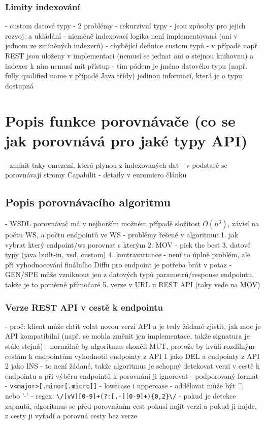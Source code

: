 \documentclass[czech,DP]{thesiskiv}
\begin{document}
\subsection{Limity indexování}

 - custom datové typy
 - 2 problémy
	- rekurzivní typy
		- jsou způsoby pro jejich rozvoj: \cite{abadi1995subytping} a ukládání
		- nicméně indexovací logika není implementovaná (ani v jednom ze zmíněných indexerů)
	- chybějící definice custom typů
		- v případě např REST jsou uloženy v implementaci (nemusí se jednat ani o stejnou knihovnu) a indexer k nim nemusí mít přístup
		- tím pádem je jméno datového typu (např. fully qualified name v případě Java třídy) jedinou informací, která je o typu dostupná

\chapter{Popis funkce porovnávače (co se jak porovnává pro jaké typy API)}

- zmínit taky omezení, která plynou z indexovaných dat
- v podstatě se porovnávají stromy Capabilit
- detaily v euromicro článku

\section{Popis porovnávacího algoritmu}
- WSDL porovnávač má v nejhorším možném případě složitost $O(n^3)$, závisí na počtu WS, a počtu endpointů ve WS 
- problémy řešené v algoritmu:
	1. jak vybrat který endpoint/ws porovnat s kterým
	2. MOV - pick the best
	3. datové typy (java built-in, xsd, custom)
	4. kontravariance
		- není to úplně problém, ale při vyhodnocování finálního Diffu pro endpoint je potřeba brát v potaz 
		- GEN/SPE může vzniknout jen z datových typů parametrů/response endpointu, takže je to poměrně přímočaré
	5. verze v URL u REST API (taky vede na MOV)
	
\subsection{Verze REST API v cestě k endpointu}	

- proč: klient může chtít volat novou verzi API a je tedy žádané zjistit, jak moc je API kompatibilní (např. se mohla změnit jen implementace, takže signatura je stále stejná)
- normálně by algoritmus skončil MUT, protože by kvůli rozdílným cestám k endpointům vyhodnotil endpointy z API 1 jako DEL a endpointy z API 2 jako INS
- to není žádané, takže algoritmus je schopný detekovat verzi v cestě k endpointu a při výběru endpointů k porovnání ji ignorovat
- podporovaný formát
	- \verb|v<major>[.minor[.micro]]|
	- lowecase i uppercase
	- oddělovat může být '.', nebo '-'
	- regex: \verb|\/[vV][0-9]+(?:[.-][0-9]+){0,2}\/|
- pokud je detekce zapnutá, algoritmus se před porovnáním cest pokusí najít verzi a pokud ji najde, z cesty ji vyřadí a porovná cesty bez verze
	
\end{document}
